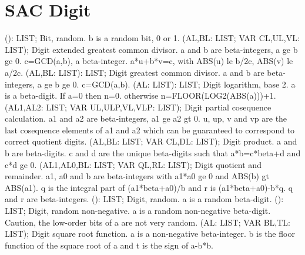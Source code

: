 \section{ SAC Digit  } 
 (): LIST; \eproc
\bcom Bit, random. b is a random bit, 0 or 1. \ecom 
{} (AL,BL: LIST; VAR CL,UL,VL: LIST); \eproc
\bcom Digit extended greatest common divisor. a and b are beta-integers,
a ge b ge 0.  c=GCD(a,b), a beta-integer.  a*u+b*v=c, with
ABS(u) le b/2c, ABS(v) le a/2c. \ecom 
{} (AL,BL: LIST): LIST; \eproc
\bcom Digit greatest common divisor. a and b are beta-integers,
a ge b ge 0. c=GCD(a,b). \ecom 
{} (AL: LIST): LIST; \eproc
\bcom Digit logarithm, base 2. a is a beta-digit. If a=0 then n=0.
otherwise n=FLOOR(LOG2(ABS(a)))+1. \ecom 
{} (AL1,AL2: LIST; VAR UL,ULP,VL,VLP: LIST); \eproc
\bcom Digit partial cosequence calculation. a1 and a2 are beta-integers,
a1 ge a2 gt 0.  u, up, v and vp are the last cosequence elements
of a1 and a2 which can be guaranteed to correspond to correct
quotient digits. \ecom 
{} (AL,BL: LIST; VAR CL,DL: LIST); \eproc
\bcom Digit product. a and b are beta-digits. c and d are the unique
beta-digits such that a*b=c*beta+d and c*d ge 0. \ecom 
{} (AL1,AL0,BL: LIST; VAR QL,RL: LIST); \eproc
\bcom Digit quotient and remainder. a1, a0 and b are beta-integers with
a1*a0 ge 0 and ABS(b) gt ABS(a1).  q is the integral part of
(a1*beta+a0)/b and r is (a1*beta+a0)-b*q.  q and r are
beta-integers. \ecom 
{} (): LIST; \eproc
\bcom Digit, random. a is a random beta-digit. \ecom 
{} (): LIST; \eproc
\bcom Digit, random non-negative. a is a random non-negative beta-digit.
Caution, the low-order bits of a are not very random. \ecom 
{} (AL: LIST; VAR BL,TL: LIST); \eproc
\bcom Digit square root function. a is a non-negative beta-integer.
b is the floor function of the square root of a and t is the sign
of a-b*b. \ecom 
